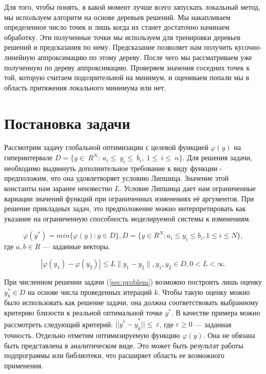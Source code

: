 \documentclass[12pt, a4paper, russian]{article}
\begin{document}
Для того, чтобы понять, в какой момент лучше всего запускать локальный метод, мы используем алгоритм на основе деревьев решений. Мы накапливаем определенное число точек и лишь когда их станет достаточно начинаем обработку. Эти полученные точки мы используем для тренировки деревьев решений и предсказания по нему. Предсказание позволяет нам получить кусочно-линейную аппроксимацию по этому дереву. После чего мы рассматриваем уже полученную по дереву аппроксимацию. Проверяем значения соседних точек к той, которую считаем подозрительной на минимум, и оцениваем попали мы в область притяжения локального минимума или нет. 

\section{Постановка задачи}

Рассмотрим задачу глобальной оптимизации с целевой функцией $\varphi(y)$ на гиперинтервале $D=\{ y\in\ R^N:\ a_i\le\ y_i\le\ b_i,\ 1 \le\, i\le\ n \}$. Для решения задачи, необходимо выдвинуть дополнительное требование к виду функции - предположим, что она удовлетворяет условию Липшица. Значение этой константы нам заранее неизвестно $L$. Условие Липшица дает нам  ограниченные вариации значений функций при ограниченных изменениях её аргументов. При решение прикладных задач, это предположение можно интерпретировать как указание на ограниченную способность моделируемой системы к изменениям. 




\begin{equation} \label{sec:problem}   
	\varphi(y^*) = min\{\varphi(y):y\in D\}, D = \{y \in R^N : a_i \leq y_i \leq b_i, 1 \leq i \leq N \},
\end{equation}
где $a,b \in R$ --- заданные векторы.


\begin{displaymath}
	|\varphi(y_1)-\varphi(y_2)|\leq L\parallel y_1-y_2 \parallel
	,y_1,y_2 \in D, 0<L< \infty.
\end{displaymath}




При численном решении задачи (\ref{sec:problem}) возможно построить лишь оценку $y_k^\ast\in D$ на основе числа проведенных итераций $k$. Чтобы такую оценку можно было использовать как решение задачи, она должна соответствовать выбранному критерию близости к реальной оптимальной точке $y^\ast$. В качестве примера можно рассмотреть следующий критерий: ${ ||y^\ast -y}_k^\ast||\le\ \varepsilon$, где $\varepsilon\geq0$ — заданная точность. Отдельно отметим оптимизируемую функцию $\varphi(y)$. Она не обязана быть представлена в аналитическом виде. Это может быть результат работы подпрограммы или библиотеки, что расширяет область ее возможного применения.
\end{document}
